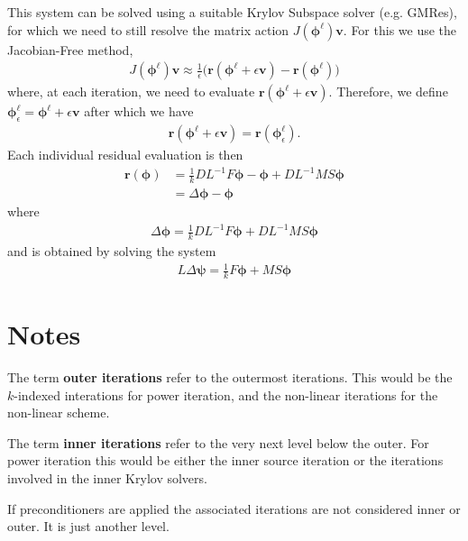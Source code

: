 \documentclass[11pt,letterpaper,notitlepage]{article}
\newcommand{\beqn}{\begin{equation}
		\begin{aligned}}
\newcommand{\eeqn}{\end{aligned}
\end{equation}}
\numberwithin{equation}{section}
\newcommand{\Linv}{L^{-1}}
\newcommand{\bphi}{\boldsymbol{\phi}}
\newcommand{\bpsi}{\boldsymbol{\psi}}
\newcommand{\br}{\mathbf{r}}
\begin{document}
This system can be solved using a suitable Krylov Subspace solver (e.g. GMRes), for which we need to still resolve the matrix action $J(\bphi^{\ell})\mathbf{v}$. For this we use the Jacobian-Free method,
\beqn 
J(\bphi^{\ell})\mathbf{v} \approx \frac{1}{\epsilon} \biggr(\br(\bphi^\ell + \epsilon \mathbf{v}) - \br(\bphi^\ell)\biggr)
\eeqn 
where, at each iteration, we need to evaluate $\br(\bphi^\ell + \epsilon \mathbf{v})$. Therefore, we define $\bphi_\epsilon^\ell = \bphi^\ell + \epsilon \mathbf{v}$ after which we have
\beqn 
\br(\bphi^\ell + \epsilon \mathbf{v}) = \br(\bphi_\epsilon^\ell).
\eeqn 
Each individual residual evaluation is then 
\beqn 
\br(\bphi) 
&= \frac{1}{k} D\Linv F \bphi - \bphi + D\Linv MS \bphi \\
&= \Delta \bphi - \bphi
\eeqn 
where
\beqn 
\Delta \bphi = \frac{1}{k} D\Linv F \bphi + D\Linv MS \bphi
\eeqn 
and is obtained by solving the system
\beqn 
L \Delta \bpsi  =  \frac{1}{k} F \bphi + MS \bphi
\eeqn 



\newpage
\section{Notes}
The term \textbf{outer iterations} refer to the outermost iterations. This would be the $k$-indexed interations for power iteration, and the non-linear iterations for the non-linear scheme.

The term \textbf{inner iterations} refer to the very next level below the outer. For power iteration this would be either the inner source iteration or the iterations involved in the inner Krylov solvers. 

If preconditioners are applied the associated iterations are not considered inner or outer. It is just another level.


\end{document}
